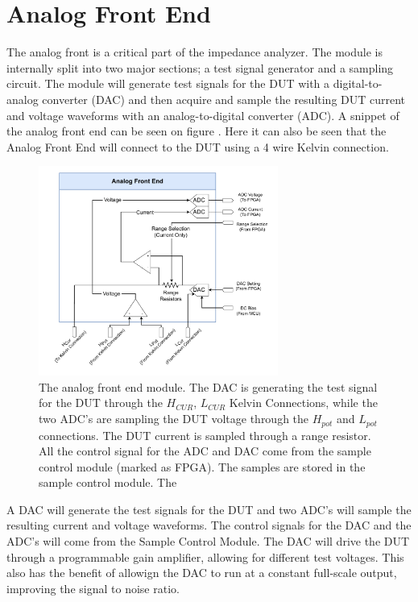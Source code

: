 \section{Analog Front End} \label{sec:AnalogFrontEnd}

The analog front is a critical part of the impedance analyzer. The module is internally split into two major sections; a test signal generator and a sampling circuit. The module will generate test signals for the DUT with a digital-to-analog converter (DAC) and then acquire and sample the resulting DUT current and voltage waveforms with an analog-to-digital converter (ADC). A snippet of the analog front end can be seen on figure . Here it can also be seen that the Analog Front End will connect to the DUT using a 4 wire Kelvin connection.

\begin{figure}[H]
    \centering
    \includegraphics[clip, trim=18 0 18 0,width=0.70\textwidth]{Sections/6_SystemArchitecture/Figures/AnalogFrontEnd.pdf}
    \caption{The analog front end module. The DAC is generating the test signal for the DUT through the $H_{CUR}$, $L_{CUR}$ Kelvin Connections, while the two ADC's are sampling the DUT voltage through the $H_{pot}$ and $L_{pot}$ connections. The DUT current is sampled through a range resistor. All the control signal for the ADC and DAC come from the sample control module (marked as FPGA). The samples are stored in the sample control module. The  }
    \label{fig_6_1_AnalogFrontEnd}
\end{figure}

A DAC will generate the test signals for the DUT and two ADC's will sample the resulting current and voltage waveforms. The control signals for the DAC and the ADC's will come from the Sample Control Module. The DAC will drive the DUT through a programmable gain amplifier, allowing for different test voltages. This also has the benefit of allowign the DAC to run at a constant full-scale output, improving the signal to noise ratio. 

